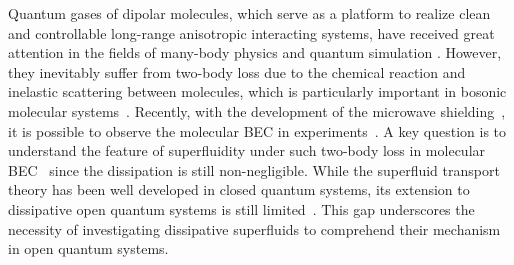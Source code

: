 \documentclass[aps,prl,twocolumn,superscriptaddress,]{revtex4-1}
\begin{document}
Quantum gases of dipolar molecules, which serve as a platform to realize clean and controllable long-range anisotropic interacting systems, have received great attention in the fields of many-body physics and quantum simulation \cite{Ni2008,Ni2010,Arthur2019,Liu2020,Bause2021,Gersema2021,Bause2023,Ospelkaus2010,Karman2018,Sebastian2016,Bigagli2023,Lin2023,Yan2020,Cairncross2021,Lam2022,Guo2022}.  However, they inevitably suffer from two-body loss due to the chemical reaction and inelastic scattering between molecules, which is particularly important in bosonic molecular systems~\cite{Arthur2019,Liu2020,Bause2021,Gersema2021,Bause2023}. Recently, with the development of the microwave shielding~\cite{Karman2018,Bigagli2023,Lin2023}, it is possible to observe the molecular BEC in experiments~\cite{Sebastian2023}. A key question is to understand the feature of superfluidity under such two-body loss in molecular BEC~\cite{Sebastian2023} since the dissipation is still non-negligible. While the superfluid transport theory has been well developed in closed quantum systems, its extension to dissipative open quantum systems is still limited~\cite{Keeling2011,Ce2022}. This gap underscores the necessity of investigating dissipative superfluids to comprehend their mechanism in open quantum systems.

\end{document}
